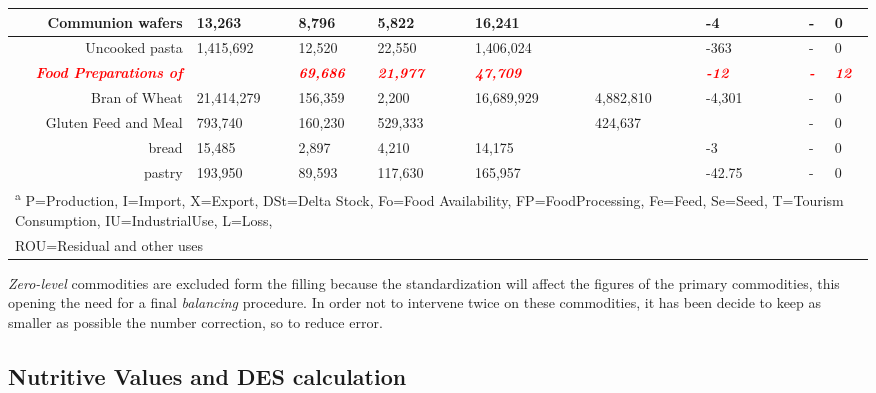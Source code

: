 \documentclass[]{article}
\begin{document}
\begin{landscape}
\begin{table}
{\begin{tabular}[t]{r|l|l|l|l|l|l|l|l|l|l|l|l|l}
\hline
Communion wafers & 13,263 & 8,796 & 5,822 &  & 16,241 &  &  &  & -4 &  &  & - & 0\\
\hline
Uncooked pasta & 1,415,692 & 12,520 & 22,550 &  & 1,406,024 &  &  &  & -363 &  &  & - & 0\\
\hline
\textcolor{red}{\em{\textbf{Food Preparations of}}} & \textcolor{red}{\em{\textbf{}}} & \textcolor{red}{\em{\textbf{69,686}}} & \textcolor{red}{\em{\textbf{21,977}}} & \textcolor{red}{\em{\textbf{}}} & \textcolor{red}{\em{\textbf{47,709}}} & \textcolor{red}{\em{\textbf{}}} & \textcolor{red}{\em{\textbf{}}} & \textcolor{red}{\em{\textbf{}}} & \textcolor{red}{\em{\textbf{-12}}} & \textcolor{red}{\em{\textbf{}}} & \textcolor{red}{\em{\textbf{}}} & \textcolor{red}{\em{\textbf{-}}} & \textcolor{red}{\em{\textbf{12}}}\\
\hline
Bran of Wheat & 21,414,279 & 156,359 & 2,200 &  & 16,689,929 &  & 4,882,810 &  & -4,301 &  &  & - & 0\\
\hline
Gluten Feed and Meal & 793,740 & 160,230 & 529,333 &  &  &  & 424,637 &  &  &  &  & - & 0\\
\hline
bread & 15,485 & 2,897 & 4,210 &  & 14,175 &  &  &  & -3 &  &  & - & 0\\
\hline
pastry & 193,950 & 89,593 & 117,630 &  & 165,957 &  &  &  & -42.75 &  &  & - & 0\\
\hline
\multicolumn{14}{l}{\textsuperscript{a} P=Production, I=Import, X=Export, DSt=Delta Stock, Fo=Food Availability, FP=FoodProcessing, Fe=Feed, Se=Seed, T=Tourism Consumption, IU=IndustrialUse, L=Loss,}\\
\multicolumn{14}{l}{ROU=Residual and other uses}\\
\end{tabular}}
\end{table}
\end{landscape}

\emph{Zero-level} commodities are excluded form the filling because the
standardization will affect the figures of the primary commodities, this
opening the need for a final \emph{balancing} procedure. In order not to
intervene twice on these commodities, it has been decide to keep as
smaller as possible the number correction, so to reduce error.

\subsection*{Nutritive Values and DES
calculation}\label{nutritive-values-and-des-calculation}
\end{document}
